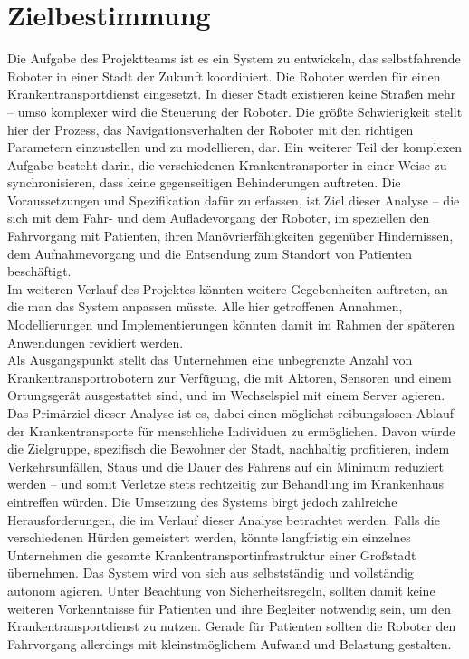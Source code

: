 
\section{Zielbestimmung}
Die Aufgabe des Projektteams ist es ein System zu entwickeln, das selbstfahrende Roboter in einer Stadt der Zukunft koordiniert. Die Roboter werden für einen Krankentransportdienst eingesetzt. In dieser Stadt existieren keine Straßen mehr – umso komplexer wird die Steuerung der Roboter. Die größte Schwierigkeit stellt hier der Prozess, das Navigationsverhalten der Roboter mit den richtigen Parametern einzustellen und zu modellieren, dar. Ein weiterer Teil der komplexen Aufgabe besteht darin, die verschiedenen Krankentransporter in einer Weise zu synchronisieren, dass keine gegenseitigen Behinderungen auftreten. Die Voraussetzungen und Spezifikation dafür zu erfassen, ist Ziel dieser Analyse – die sich mit dem Fahr- und dem Aufladevorgang der Roboter, im speziellen den Fahrvorgang mit Patienten, ihren Manövrierfähigkeiten gegenüber Hindernissen, dem Aufnahmevorgang und die Entsendung zum Standort von Patienten beschäftigt.\\

Im weiteren Verlauf des Projektes könnten weitere Gegebenheiten auftreten, an die man das System anpassen müsste. Alle hier getroffenen Annahmen, Modellierungen und Implementierungen könnten damit im Rahmen der späteren Anwendungen revidiert werden.\\

Als Ausgangspunkt stellt das Unternehmen eine unbegrenzte Anzahl von Krankentransportrobotern zur Verfügung, die mit Aktoren, Sensoren und einem Ortungsgerät ausgestattet sind, und im Wechselspiel mit einem Server agieren.\\

Das Primärziel dieser Analyse ist es, dabei einen möglichst reibungslosen Ablauf der Krankentransporte für menschliche Individuen zu ermöglichen. Davon würde die Zielgruppe, spezifisch die Bewohner der Stadt, nachhaltig profitieren, indem Verkehrsunfällen, Staus und die Dauer des Fahrens auf ein Minimum reduziert werden – und somit Verletze stets rechtzeitig zur Behandlung im Krankenhaus eintreffen würden. Die Umsetzung des Systems birgt jedoch zahlreiche Herausforderungen, die im Verlauf dieser Analyse betrachtet werden. Falls die verschiedenen Hürden gemeistert werden, könnte langfristig ein einzelnes Unternehmen die gesamte Krankentransportinfrastruktur einer Großstadt übernehmen. Das System wird von sich aus selbstständig und vollständig autonom agieren. Unter Beachtung von Sicherheitsregeln, sollten damit keine weiteren Vorkenntnisse für Patienten und ihre Begleiter notwendig sein, um den Krankentransportdienst zu nutzen. Gerade für Patienten sollten die Roboter den Fahrvorgang allerdings mit kleinstmöglichem Aufwand und Belastung gestalten.\\\\

